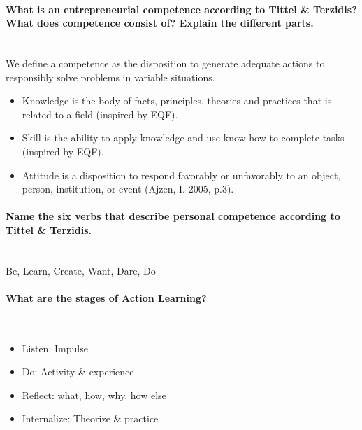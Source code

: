 \documentclass[10pt,a4paper,noendnumber=true]{scrartcl}
\newcommand{\properparagraph}[1]{\paragraph{\textcolor{Emerald}{#1}}\mbox{}\\}
\begin{document}
\properparagraph{What is an entrepreneurial competence according to Tittel \& Terzidis? What does competence consist of? Explain the different parts.}
We define a competence as the disposition to generate adequate actions to responsibly solve problems in variable situations.
\begin{itemize}
	\item Knowledge is the body of facts, principles, theories and 	practices that is related to a field (inspired by EQF).
	\item  Skill is the ability to apply knowledge and use know-how to complete tasks (inspired by EQF).
	\item  Attitude is a disposition to respond favorably or unfavorably to an object, person, institution, or event (Ajzen, I. 2005, p.3).
\end{itemize}


\properparagraph{Name the six verbs that describe personal competence according to Tittel \& Terzidis.}
Be, Learn, Create, Want, Dare, Do

\properparagraph{What are the stages of Action Learning?}
\begin{itemize}
	\item Listen: Impulse
	\item Do: Activity \& experience
	\item Reflect: what, how, why, how else
	\item Internalize: Theorize \& practice
\end{itemize}

\newpage
\end{document}
